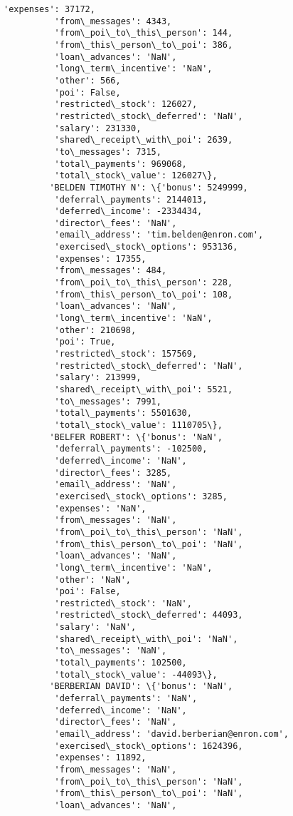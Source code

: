 \documentclass[11pt]{article}
\begin{document}
\begin{Verbatim}[commandchars=\\\{\}]
          'expenses': 37172,
          'from\_messages': 4343,
          'from\_poi\_to\_this\_person': 144,
          'from\_this\_person\_to\_poi': 386,
          'loan\_advances': 'NaN',
          'long\_term\_incentive': 'NaN',
          'other': 566,
          'poi': False,
          'restricted\_stock': 126027,
          'restricted\_stock\_deferred': 'NaN',
          'salary': 231330,
          'shared\_receipt\_with\_poi': 2639,
          'to\_messages': 7315,
          'total\_payments': 969068,
          'total\_stock\_value': 126027\},
         'BELDEN TIMOTHY N': \{'bonus': 5249999,
          'deferral\_payments': 2144013,
          'deferred\_income': -2334434,
          'director\_fees': 'NaN',
          'email\_address': 'tim.belden@enron.com',
          'exercised\_stock\_options': 953136,
          'expenses': 17355,
          'from\_messages': 484,
          'from\_poi\_to\_this\_person': 228,
          'from\_this\_person\_to\_poi': 108,
          'loan\_advances': 'NaN',
          'long\_term\_incentive': 'NaN',
          'other': 210698,
          'poi': True,
          'restricted\_stock': 157569,
          'restricted\_stock\_deferred': 'NaN',
          'salary': 213999,
          'shared\_receipt\_with\_poi': 5521,
          'to\_messages': 7991,
          'total\_payments': 5501630,
          'total\_stock\_value': 1110705\},
         'BELFER ROBERT': \{'bonus': 'NaN',
          'deferral\_payments': -102500,
          'deferred\_income': 'NaN',
          'director\_fees': 3285,
          'email\_address': 'NaN',
          'exercised\_stock\_options': 3285,
          'expenses': 'NaN',
          'from\_messages': 'NaN',
          'from\_poi\_to\_this\_person': 'NaN',
          'from\_this\_person\_to\_poi': 'NaN',
          'loan\_advances': 'NaN',
          'long\_term\_incentive': 'NaN',
          'other': 'NaN',
          'poi': False,
          'restricted\_stock': 'NaN',
          'restricted\_stock\_deferred': 44093,
          'salary': 'NaN',
          'shared\_receipt\_with\_poi': 'NaN',
          'to\_messages': 'NaN',
          'total\_payments': 102500,
          'total\_stock\_value': -44093\},
         'BERBERIAN DAVID': \{'bonus': 'NaN',
          'deferral\_payments': 'NaN',
          'deferred\_income': 'NaN',
          'director\_fees': 'NaN',
          'email\_address': 'david.berberian@enron.com',
          'exercised\_stock\_options': 1624396,
          'expenses': 11892,
          'from\_messages': 'NaN',
          'from\_poi\_to\_this\_person': 'NaN',
          'from\_this\_person\_to\_poi': 'NaN',
          'loan\_advances': 'NaN',

\end{Verbatim}
\end{document}
